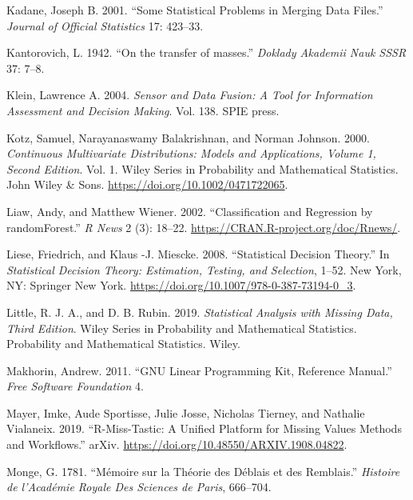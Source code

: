 \begin{CSLReferences}{1}{0}
\leavevmode{}%
Kadane, Joseph B. 2001. {``Some Statistical Problems in Merging Data Files.''} \emph{Journal of Official Statistics} 17: 423--33.

\leavevmode{}%
Kantorovich, L. 1942. {``{On the transfer of masses}.''} \emph{Doklady Akademii Nauk SSSR} 37: 7--8.

\leavevmode{}%
Klein, Lawrence A. 2004. \emph{Sensor and Data Fusion: A Tool for Information Assessment and Decision Making}. Vol. 138. SPIE press.

\leavevmode{}%
Kotz, Samuel, Narayanaswamy Balakrishnan, and Norman Johnson. 2000. \emph{Continuous Multivariate Distributions: Models and Applications, Volume 1, Second Edition}. Vol. 1. Wiley Series in Probability and Mathematical Statistics. John Wiley \& Sons. \url{https://doi.org/10.1002/0471722065}.

\leavevmode{}%
Liaw, Andy, and Matthew Wiener. 2002. {``Classification and Regression by randomForest.''} \emph{R News} 2 (3): 18--22. \url{https://CRAN.R-project.org/doc/Rnews/}.

\leavevmode{}%
Liese, Friedrich, and Klaus -J. Miescke. 2008. {``Statistical Decision Theory.''} In \emph{Statistical Decision Theory: Estimation, Testing, and Selection}, 1--52. New York, NY: Springer New York. \url{https://doi.org/10.1007/978-0-387-73194-0_3}.

\leavevmode{}%
Little, R. J. A., and D. B. Rubin. 2019. \emph{Statistical Analysis with Missing Data, Third Edition}. Wiley Series in Probability and Mathematical Statistics. Probability and Mathematical Statistics. Wiley.

\leavevmode{}%
Makhorin, Andrew. 2011. {``GNU Linear Programming Kit, Reference Manual.''} \emph{Free Software Foundation} 4.

\leavevmode{}%
Mayer, Imke, Aude Sportisse, Julie Josse, Nicholas Tierney, and Nathalie Vialaneix. 2019. {``R-Miss-Tastic: A Unified Platform for Missing Values Methods and Workflows.''} arXiv. \url{https://doi.org/10.48550/ARXIV.1908.04822}.

\leavevmode{}%
Monge, G. 1781. {``{Mémoire sur la Théorie des Déblais et des Remblais}.''} \emph{Histoire de l'Académie Royale Des Sciences de Paris}, 666--704.


\end{CSLReferences}
